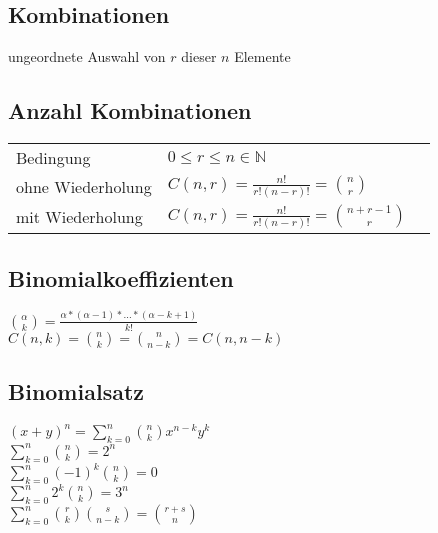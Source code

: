 \subsection{Kombinationen}
ungeordnete Auswahl von $r$ dieser $n$ Elemente


\subsection{Anzahl Kombinationen}
\begin{tabular}{lll}
    Bedingung & $0 \leq r \leq n \in \mathbb{N} $ \\
    ohne Wiederholung & $C(n,r) = \frac{n!}{r!(n-r)!} = \binom{n}{r}$ \\
    mit Wiederholung & $C(n,r) = \frac{n!}{r!(n-r)!} = \binom{n+r-1}{r}$ \\
\end{tabular}

\subsection{Binomialkoeffizienten}
$ \binom{\alpha}{k} = \frac{\alpha * (\alpha - 1) * \dots * (\alpha - k + 1)}{k!} $ \\
$ C(n,k) = \binom{n}{k} = \binom{n}{n-k} = C(n, n-k)$

\subsection{Binomialsatz}
$ (x + y)^n = \sum_{k=0}^n \binom{n}{k} x^{n-k} y^k $ \\
$ \sum_{k=0}^n \binom{n}{k} = 2^n $ \\
$ \sum_{k=0}^n (-1)^k \binom{n}{k} = 0 $ \\
$ \sum_{k=0}^n 2^k \binom{n}{k} = 3^n $ \\
$ \sum_{k=0}^n \binom{r}{k} \binom{s}{n-k} = \binom{r + s}{n} $ \\


